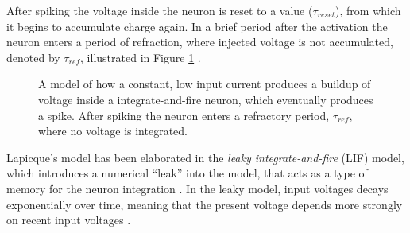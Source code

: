 \documentclass[report.tex]{subfiles}
\begin{document}
After spiking the voltage inside the neuron is reset to a value ($\tau_{reset}$),
from which it begins to accumulate charge again.
In a brief period after the activation the neuron enters a period of
refraction, 
where injected voltage is not accumulated, denoted by 
$\tau_{ref}$, illustrated in Figure \ref{fig:spiking}
\cite[p. 82]{Eliasmith2004}.

\begin{figure}
\centering

\caption{A model of how a constant, low input current produces a buildup of
	voltage inside a integrate-and-fire neuron, which eventually produces a spike.
	After spiking the neuron enters a refractory period, $\tau_{ref}$,
   	where no voltage is integrated.}
\label{fig:spiking}
\end{figure}

Lapicque's model has been elaborated in the \textit{leaky
integrate-and-fire} (LIF) 
model, which introduces a numerical ``leak''
into the model, that acts as a type of memory 
for the neuron integration \cite{Eliasmith2004, Eliasmith2015}.
In the leaky model, input voltages decays exponentially over time,
meaning that the present voltage depends more strongly on recent input
voltages \cite[p. 85]{Eliasmith2004}.
\end{document}
